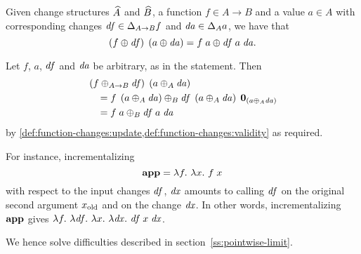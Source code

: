 \begin{theorem}[Incrementalization]
  \label{thm:incrementalization}
  Given change structures $\widehat{A}$ and $\widehat{B}$, a function $f \in A \to B$
  and a value $a \in A$ with corresponding changes $\D f \in
  \Change[A \to B]{f}$ and $\D a \in \Change[A]{a}$, we have that
  \[\App{\Apply*{\D f}{f}}{\Apply*{\D a}{a}}
  = \Apply{\App{\App{\D f}{a}}{\D a}}{\App{f}{a}}\text{.}\qed\]
\end{theorem}

\begin{optionalproof}

  Let $f$, $a$, $\mathit{df}$ and $\mathit{da}$ be arbitrary, as in the statement. Then
  \begin{align*}
    & \App{\Apply*[A \to B]{\D f}{f}}{\Apply*[A]{\D a}{a}}\\
    & \quad = \Apply[B]{\App{\App{\D f}{\TheNewValue}}{\Nil{\TheNewValue}}}{\App{f}{\TheNewValue}}\\
    & \quad = \Apply[B]{\App{\App{\D f}{a}}{\D a}}{\App{f}{a}}
  \end{align*}
  by
  \cref{def:function-changes:update,def:function-changes:validity}
  as required.
\end{optionalproof}

For instance,
incrementalizing
\[
\APPFun = \Lam{f}{\Lam{x}{\App f x}}
\]
with respect to the input changes $\mathit{df}$, $\mathit{dx}$ amounts to
calling $\mathit{df}$ on the original second argument $x_{\textrm{old}}$ and on
the change $\mathit{dx}$. In other words, incrementalizing $\textbf{app}$ gives
$\Lam{f} {\Lam{\D f} {\Lam{x} {\Lam{\D x} {\App {\App {\D f} x} {\D x}}}}}$.
\begin{oldSec}
We hence solve difficulties described in
section~\ref{ss:pointwise-limit}.
\end{oldSec}

